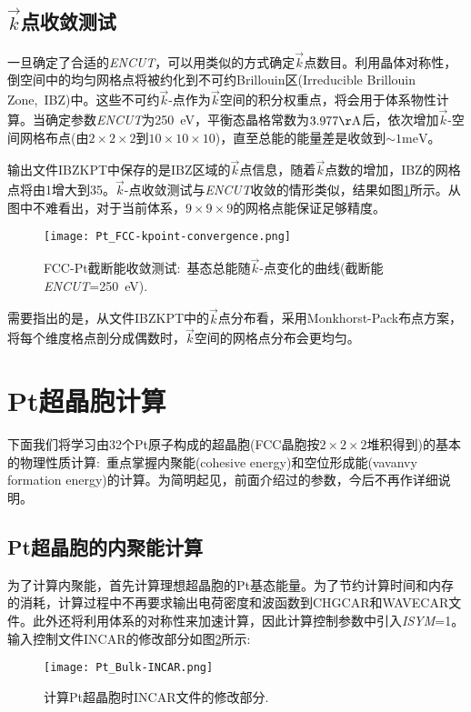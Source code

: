 \subsection{$\vec k$点收敛测试}
一旦确定了合适的\textit{ENCUT}，可以用类似的方式确定$\vec k$点数目。利用晶体对称性，倒空间中的均匀网格点将被约化到不可约\textrm{Brillouin}区(\textrm{Irreducible Brillouin Zone,~IBZ})中。这些不可约$\vec k$-点作为$\vec k$空间的积分权重点，将会用于体系物性计算。当确定参数\textit{ENCUT}为250\textrm{~eV}，平衡态晶格常数为$3.977\mathrm{\AA}$后，依次增加$\vec k$-空间网格布点(由$2\times2\times2$到$10\times10\times10$)，直至总能的能量差是收敛到$\sim1\mathrm{meV}$。

输出文件\textrm{IBZKPT}中保存的是\textrm{IBZ}区域的$\vec k$点信息，随着$\vec k$点数的增加，\textrm{IBZ}的网格点将由1增大到35。$\vec k$-点收敛测试与\textit{ENCUT}收敛的情形类似，结果如图\ref{Pt_FCC-kpoint-curve}所示。从图中不难看出，对于当前体系，$9\times9\times9$的网格点能保证足够精度。
\begin{figure}[h!]
\centering
\texttt{[image: Pt\_FCC-kpoint-convergence.png]}
\caption{\small \textrm{FCC-Pt}截断能收敛测试:~基态总能随$\vec k$-点变化的曲线(截断能\textit{ENCUT}=250\textrm{~eV}).}%
\label{Pt_FCC-kpoint-curve}
\end{figure}

需要指出的是，从文件\textrm{IBZKPT}中的$\vec k$点分布看，采用\textrm{Monkhorst-Pack}布点方案，将每个维度格点剖分成偶数时，$\vec k$空间的网格点分布会更均匀。

\section{Pt超晶胞计算}\label{Sec:bulk-Pt}
下面我们将学习由32个\textrm{Pt}原子构成的超晶胞(\textrm{FCC}晶胞按$2\times2\times2$堆积得到)的基本的物理性质计算:~重点掌握内聚能\textrm{(cohesive energy)}和空位形成能\textrm{(vavanvy formation energy)}的计算。为简明起见，前面介绍过的参数，今后不再作详细说明。

\subsection{Pt超晶胞的内聚能计算}
为了计算内聚能，首先计算理想超晶胞的\textrm{Pt}基态能量。为了节约计算时间和内存的消耗，计算过程中不再要求输出电荷密度和波函数到\textrm{CHGCAR}和\textrm{WAVECAR}文件。此外还将利用体系的对称性来加速计算，因此计算控制参数中引入\textit{ISYM}=1。输入控制文件\textrm{INCAR}的修改部分如图\ref{Pt_Bulk-INCAR-modified}所示:~
\begin{figure}[h!]
\centering
\texttt{[image: Pt\_Bulk-INCAR.png]}
\caption{\small \textrm{计算\textrm{Pt}超晶胞时\textrm{INCAR}文件的修改部分.}}%
\label{Pt_Bulk-INCAR-modified}
\end{figure}

